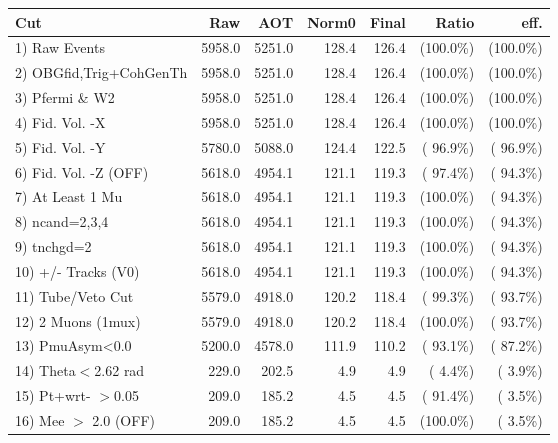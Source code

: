  \begin{table}[h!]\centering
 \begin{tabular}{||l||r|r|r|r|r|r||}
 \hline
 \hline
 Cut & Raw & AOT & Norm0 & Final & Ratio & eff.       \\
 \hline
  1) Raw Events           &       5958.0 &       5251.0 &        128.4 &        126.4 & (100.0\%) & (100.0\%) \\
  2) OBGfid,Trig+CohGenTh &       5958.0 &       5251.0 &        128.4 &        126.4 & (100.0\%) & (100.0\%) \\
  3) Pfermi \& W2         &       5958.0 &       5251.0 &        128.4 &        126.4 & (100.0\%) & (100.0\%) \\
  4) Fid. Vol. -X         &       5958.0 &       5251.0 &        128.4 &        126.4 & (100.0\%) & (100.0\%) \\
  5) Fid. Vol. -Y         &       5780.0 &       5088.0 &        124.4 &        122.5 & ( 96.9\%) & ( 96.9\%) \\
  6) Fid. Vol. -Z (OFF)   &       5618.0 &       4954.1 &        121.1 &        119.3 & ( 97.4\%) & ( 94.3\%) \\
  7) At Least 1 Mu        &       5618.0 &       4954.1 &        121.1 &        119.3 & (100.0\%) & ( 94.3\%) \\
  8) ncand=2,3,4          &       5618.0 &       4954.1 &        121.1 &        119.3 & (100.0\%) & ( 94.3\%) \\
  9) tnchgd=2             &       5618.0 &       4954.1 &        121.1 &        119.3 & (100.0\%) & ( 94.3\%) \\
 10) +/- Tracks (V0)      &       5618.0 &       4954.1 &        121.1 &        119.3 & (100.0\%) & ( 94.3\%) \\
 11) Tube/Veto Cut        &       5579.0 &       4918.0 &        120.2 &        118.4 & ( 99.3\%) & ( 93.7\%) \\
 12) 2 Muons (1mux)       &       5579.0 &       4918.0 &        120.2 &        118.4 & (100.0\%) & ( 93.7\%) \\
 13) PmuAsym<0.0          &       5200.0 &       4578.0 &        111.9 &        110.2 & ( 93.1\%) & ( 87.2\%) \\
 14) Theta$<$2.62 rad     &        229.0 &        202.5 &          4.9 &          4.9 & (  4.4\%) & (  3.9\%) \\
 15) Pt+wrt- $>$0.05      &        209.0 &        185.2 &          4.5 &          4.5 & ( 91.4\%) & (  3.5\%) \\
 16) Mee $>$ 2.0  (OFF)   &        209.0 &        185.2 &          4.5 &          4.5 & (100.0\%) & (  3.5\%) \\

\end{tabular}
\end{table}

